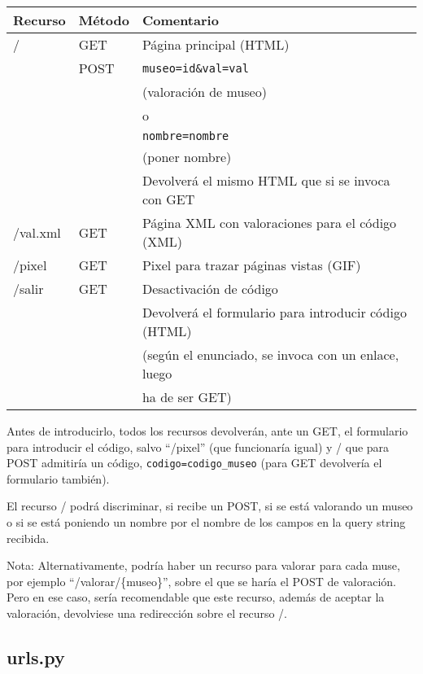 \begin{tabular}{|l|l|l|}
  \hline
  Recurso & Método & Comentario \\ \hline \hline
  /       & GET    & Página principal (HTML) \\
          & POST   & \verb|museo=id&val=val| \\
          &        & (valoración de museo) \\
          &        & o \\
          &        & \verb|nombre=nombre| \\
          &        & (poner nombre) \\
          &        & Devolverá el mismo HTML que si se invoca con GET \\ \hline
  /val.xml & GET   & Página XML con valoraciones para el código (XML) \\ \hline
  /pixel  & GET    & Pixel para trazar páginas vistas (GIF) \\ \hline
  /salir  & GET    & Desactivación de código \\
          &        & Devolverá el formulario para introducir código (HTML) \\
          &        & (según el enunciado, se invoca con un enlace, luego \\
          &        & ha de ser GET) \\ \hline
\end{tabular}

Antes de introducirlo, todos los recursos devolverán, ante un GET, el formulario para introducir el código, salvo ``/pixel'' (que funcionaría igual) y / que para POST admitiría un código, \verb|codigo=codigo_museo| (para GET devolvería el formulario también).

El recurso / podrá discriminar, si recibe un POST, si se está valorando un museo o si se está poniendo un nombre por el nombre de los campos en la query string recibida.

\vspace{.3cm}

Nota: Alternativamente, podría haber un recurso para valorar para cada muse, por ejemplo ``/valorar/\{museo\}'', sobre el que se haría el POST de valoración. Pero en ese caso, sería recomendable que este recurso, además de aceptar la valoración, devolviese una redirección sobre el recurso /.

\subsection*{urls.py}

